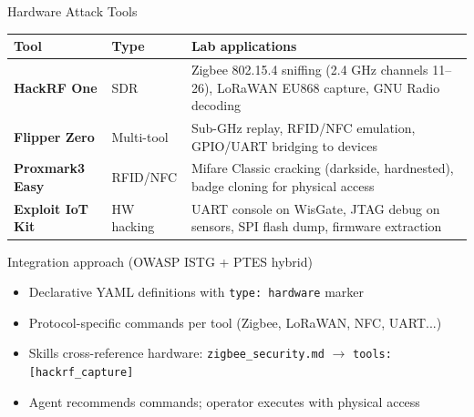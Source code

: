 \documentclass[aspectratio=169]{beamer}
\begin{document}
\begin{frame}{Hardware Attack Tools}

\begin{table}
\centering
\small
\begin{tabular}{@{}llp{7cm}@{}}
\toprule
\textbf{Tool} & \textbf{Type} & \textbf{Lab applications} \\
\midrule
\textbf{HackRF One} & SDR & Zigbee 802.15.4 sniffing (2.4 GHz channels 11--26), LoRaWAN EU868 capture, GNU Radio decoding \\
\textbf{Flipper Zero} & Multi-tool & Sub-GHz replay, RFID/NFC emulation, GPIO/UART bridging to devices \\
\textbf{Proxmark3 Easy} & RFID/NFC & Mifare Classic cracking (darkside, hardnested), badge cloning for physical access \\
\textbf{Exploit IoT Kit} & HW hacking & UART console on WisGate, JTAG debug on sensors, SPI flash dump, firmware extraction \\
\bottomrule
\end{tabular}
\end{table}

\vspace{0.3cm}
\begin{block}{Integration approach (OWASP ISTG + PTES hybrid)}
\begin{itemize}
    \item Declarative YAML definitions with \texttt{type: hardware} marker
    \item Protocol-specific commands per tool (Zigbee, LoRaWAN, NFC, UART...)
    \item Skills cross-reference hardware: \texttt{zigbee\_security.md} $\rightarrow$ \texttt{tools: [hackrf\_capture]}
    \item Agent recommends commands; operator executes with physical access
\end{itemize}
\end{block}
\end{frame}
\end{document}
